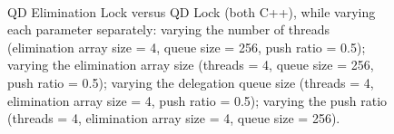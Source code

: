 \begin{figure}[]
\centering
{}
\\
\caption[]{QD Elimination Lock versus QD Lock (both C++), while varying each parameter separately:  varying the number of threads (elimination array size = 4, queue size = 256, push ratio = 0.5);  varying the elimination array size (threads = 4, queue size = 256, push ratio = 0.5);  varying the delegation queue size (threads = 4, elimination array size = 4, push ratio = 0.5);  varying the push ratio (threads = 4, elimination array size = 4, queue size = 256).}
\label{fig:qdlock}
\end{figure}

